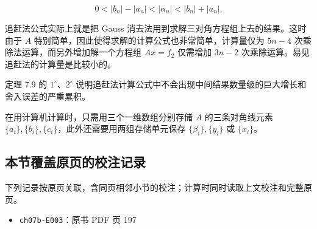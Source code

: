 \documentclass[
  10pt,
  fontset=fandol]{ctexart}
\providecommand{\tightlist}{%
  \setlength{\itemsep}{0pt}\setlength{\parskip}{0pt}}
\begin{document}
\[
0<|b_n|-|a_n|<|\alpha_n|<|b_n|+|a_n|.
\]

追赶法公式实际上就是把 Gauss 消去法用到求解三对角方程组上去的结果。这时由于 \(A\) 特别简单，因此使得求解的计算公式也非常简单，计算量仅为 \(5n-4\) 次乘除法运算，而另外增加解一个方程组 \(Ax=f_2\) 仅需增加 \(3n-2\) 次乘除运算。易见追赶法的计算量是比较小的。

定理 7.9 的 \(1^\circ\)、\(2^\circ\) 说明追赶法计算公式中不会出现中间结果数量级的巨大增长和舍入误差的严重累积。

在用计算机计算时，只需用三个一维数组分别存储 \(A\) 的三条对角线元素 \(\{a_i\},\{b_i\},\{c_i\}\)，此外还需要用两组存储单元保存 \(\{\beta_i\},\{y_i\}\) 或 \(\{x_i\}\)。

\subsection{本节覆盖原页的校注记录}\label{ux672cux8282ux8986ux76d6ux539fux9875ux7684ux6821ux6ce8ux8bb0ux5f55}

下列记录按原页关联，含同页相邻小节的校注；计算时同时读取上文校注和完整原页。

\begin{itemize}
\tightlist
\item
  \texttt{ch07b-E003}：原书 PDF 页 197
\end{itemize}
\end{document}
